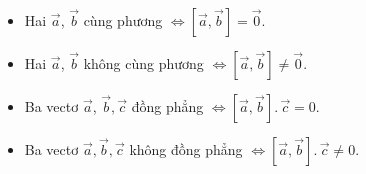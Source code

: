 \begin{itemize}
	\item  Hai $\overrightarrow{a}$, $\overrightarrow{b}$ cùng phương $\Leftrightarrow \left[\overrightarrow{a}, \overrightarrow{b}\right]=\overrightarrow{0}$.
	\item  Hai $\overrightarrow{a}$, $\overrightarrow{b}$ không cùng phương $\Leftrightarrow \left[\overrightarrow{a}, \overrightarrow{b}\right]\ne \overrightarrow{0}$.
	\item  Ba vectơ $\overrightarrow{a}$, $\overrightarrow{b},\overrightarrow{c}$ đồng phẳng $\Leftrightarrow \left[\overrightarrow{a}, \overrightarrow{b}\right].\, \overrightarrow{c}=0$.
	\item  Ba vectơ $\overrightarrow{a}, \overrightarrow{b}, \overrightarrow{c}$ không đồng phẳng $\Leftrightarrow \left[\overrightarrow{a}, \overrightarrow{b}\right].\, \overrightarrow{c}\ne 0$.
\end{itemize}

